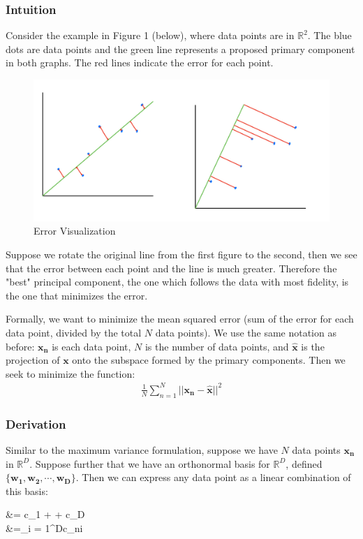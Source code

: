 \documentclass{article}
\begin{document}
\vspace{2mm}
\noindent
\subsubsection{Intuition}
\noindent Consider the example in Figure 1 (below), where data points are in $\mathbb{R}^2$. The blue dots are data points and the green line represents a proposed primary component in both graphs. The red lines indicate the error for each point.

\begin{figure}[h]
    \centering
    \includegraphics[scale=0.25]{images/minimum_error.jpg}
    \caption{Error Visualization}
\end{figure}

\vspace{2mm}
\noindent Suppose we rotate the original line from the first figure to the second, then we see that the error between each point and the line is much greater. Therefore the "best" principal component, the one which follows the data with most fidelity, is the one that minimizes the error. 

\vspace{2mm}
\noindent Formally, we want to minimize the mean squared error (sum of the error for each data point, divided by the total $N$ data points). We use the same notation as before: $\mathbf{x_n}$ is each data point, $N$ is the number of data points, and $\mathbf{\hat{x}}$ is the projection of $\mathbf{x}$ onto the subspace formed by the primary components. Then we seek to minimize the function: \
\begin{align*}
    \frac{1}{N}\sum_{n=1}^{N}||\mathbf{x_n - \hat{x}}||^2
\end{align*}

\subsubsection{Derivation}
\noindent Similar to the maximum variance formulation, suppose we have $N$ data points $\mathbf{x_n}$ in $\mathbb{R}^D$. Suppose further that we have an orthonormal basis for $\mathbb{R}^D$, defined $\{\mathbf{w_1, w_2, \cdots, w_D}\}$. Then we can express any data point as a linear combination of this basis:
\vspace{-5mm}
\begin{flalign*}
     &= c_1 + \cdots + c_D\\
    &=\Sigma_{i = 1}^{D}c_{ni}\mathbf{w_i}
\end{flalign*}
\end{document}
